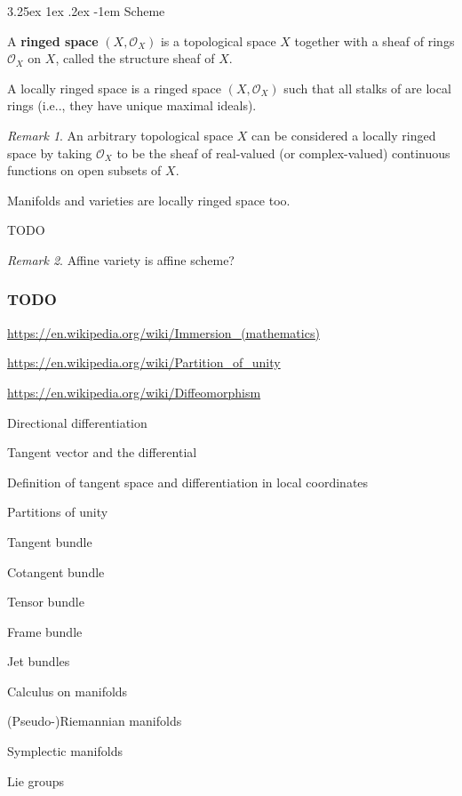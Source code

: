 \documentclass[12pt, letterpaper]{article}
\makeatletter
\renewcommand\subparagraph{\@startsection{subparagraph}{5}{\parindent}%
	{3.25ex \@plus1ex \@minus .2ex}%
	{0.75ex plus 0.1ex}%
	{\normalfont\normalsize\bfseries}}
\newcommand\ie{i.e\@ifnextchar.{}{.\@}}
\newcommand{\red}[1]{{\color{red} #1}}
\renewcommand\subparagraph{\@startsection{subparagraph}{5}{\parindent}%
	{3.25ex \@plus1ex \@minus .2ex}%
	{-1em}%
	{\normalfont\normalsize\bfseries}}
\theoremstyle{definition}
\theoremstyle{remark}
\newtheorem*{rem*}{Remark}
\theoremstyle{definition}
\theoremstyle{plain}
\numberwithin{equation}{section}
\makeatother
\begin{document}
	\subparagraph{Scheme}
	\begin{def*}
		A \textbf{ringed space} $(X,{\mathcal {O}}_{X})$ is a topological space $X$
		together with a sheaf of rings ${\mathcal {O}}_{X}$ on $X$,
		called the structure sheaf of $X$.
	\end{def*}
	
	\begin{def*}
		A locally ringed space is a ringed space $(X,{\mathcal  {O}}_{X})$ such that all stalks of 
		are local rings (\ie, they have unique maximal ideals).
	\end{def*}
	\begin{rem*}
		An arbitrary topological space $X$ can be considered a locally ringed space by taking ${\mathcal {O}}_{X}$ to be the sheaf of real-valued (or complex-valued) continuous functions on open subsets of $X$.
		
		Manifolds and varieties are locally ringed space too.
	\end{rem*}

	\begin{def*}
		\red{TODO}
	\end{def*}
	\begin{rem*}
		\red{Affine variety is affine scheme?}
	\end{rem*}
	

	\subsubsection{TODO}
	
	\url{https://en.wikipedia.org/wiki/Immersion_(mathematics)}
	

	\url{https://en.wikipedia.org/wiki/Partition_of_unity}
	
	\url{https://en.wikipedia.org/wiki/Diffeomorphism}

	\red{	Directional differentiation
		
		Tangent vector and the differential
		
		Definition of tangent space and differentiation in local coordinates
		
		Partitions of unity
		
		Tangent bundle
		
		Cotangent bundle
		
		Tensor bundle
		
		Frame bundle
		
		Jet bundles
		
		Calculus on manifolds
		
		(Pseudo-)Riemannian manifolds
		
		Symplectic manifolds
		
		Lie groups
	}
	
\end{document}
